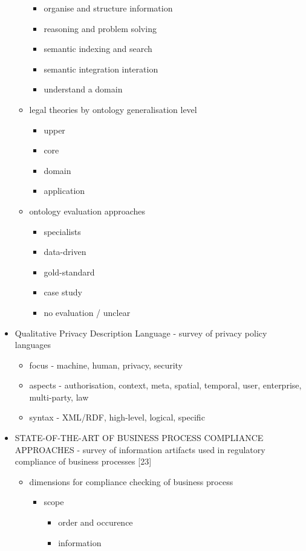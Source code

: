 \begin{itemize}
\begin{itemize}
\begin{itemize}
		\item organise and structure information
		\item reasoning and problem solving
		\item semantic indexing and search
		\item semantic integration interation
		\item understand a domain
		\end{itemize}
	\item legal theories by ontology generalisation level
		\begin{itemize}
		\item upper
		\item core
		\item domain
		\item application
		\end{itemize}
	\item ontology evaluation approaches
		\begin{itemize}
		\item specialists
		\item data-driven
		\item gold-standard
		\item case study
		\item no evaluation / unclear
		\end{itemize}
	\end{itemize}
\item Qualitative Privacy Description Language - survey of privacy policy languages
	\begin{itemize}
	\item focus - machine, human, privacy, security
	\item aspects - authorisation, context, meta, spatial, temporal, user, enterprise, multi-party, law
	\item syntax - XML/RDF, high-level, logical, specific
	\end{itemize}
\item STATE-OF-THE-ART OF BUSINESS PROCESS  COMPLIANCE APPROACHES - survey of information artifacts used in regulatory compliance of business processes [23]
	\begin{itemize}
	\item dimensions for compliance checking of business process
		\begin{itemize}
		\item scope
			\begin{itemize}
			\item order and occurence
			\item information

\end{itemize}
\end{itemize}
\end{itemize}
\end{itemize}
